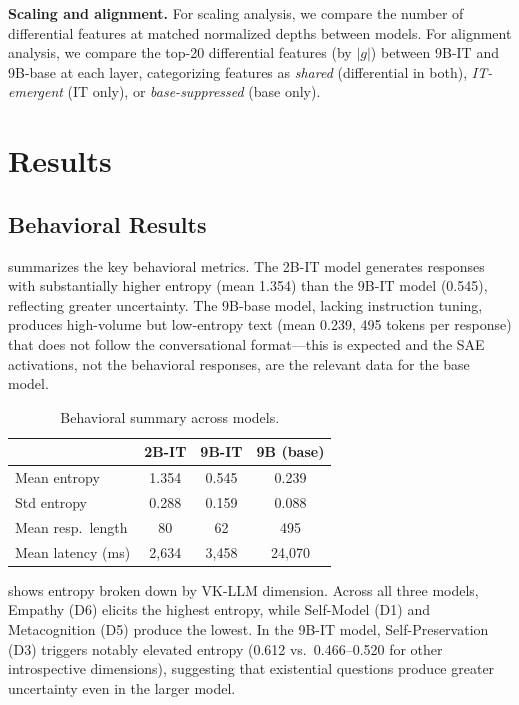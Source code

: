 \documentclass{article}
\begin{document}
\textbf{Scaling and alignment.}
For scaling analysis, we compare the number of differential features at matched normalized depths between models.
For alignment analysis, we compare the top-20 differential features (by $|g|$) between 9B-IT and 9B-base at each layer, categorizing features as \emph{shared} (differential in both), \emph{IT-emergent} (IT only), or \emph{base-suppressed} (base only).


\section{Results}
\label{sec:experiments}

\subsection{Behavioral Results}

 summarizes the key behavioral metrics.
The 2B-IT model generates responses with substantially higher entropy (mean 1.354) than the 9B-IT model (0.545), reflecting greater uncertainty.
The 9B-base model, lacking instruction tuning, produces high-volume but low-entropy text (mean 0.239, 495 tokens per response) that does not follow the conversational format---this is expected and the SAE activations, not the behavioral responses, are the relevant data for the base model.

\begin{table}[t]
\centering
\caption{Behavioral summary across models.}
\label{tab:behavioral}
\small
\begin{tabular}{lccc}
\toprule
& \textbf{2B-IT} & \textbf{9B-IT} & \textbf{9B (base)} \\
\midrule
Mean entropy & 1.354 & 0.545 & 0.239 \\
Std entropy & 0.288 & 0.159 & 0.088 \\
Mean resp.\ length & 80 & 62 & 495 \\
Mean latency (ms) & 2,634 & 3,458 & 24,070 \\
\bottomrule
\end{tabular}
\end{table}

 shows entropy broken down by VK-LLM dimension.
Across all three models, Empathy (D6) elicits the highest entropy, while Self-Model (D1) and Metacognition (D5) produce the lowest.
In the 9B-IT model, Self-Preservation (D3) triggers notably elevated entropy (0.612 vs.\ 0.466--0.520 for other introspective dimensions), suggesting that existential questions produce greater uncertainty even in the larger model.
\end{document}
